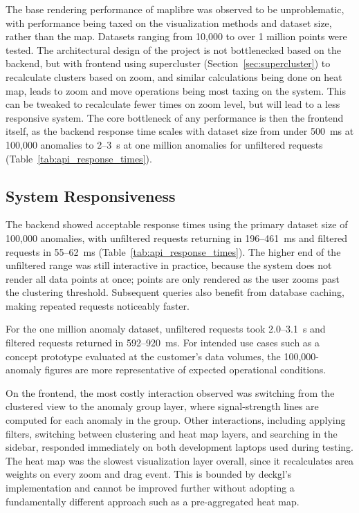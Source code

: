 The base rendering performance of \gls{maplibre} was observed to be unproblematic, with performance being taxed on the visualization methods and dataset size, rather than the map. Datasets ranging from 10,000 to over 1 million points were tested. The architectural design of the project is not bottlenecked based on the backend, but with frontend using supercluster (Section~\ref{sec:supercluster}) to recalculate clusters based on zoom, and similar calculations being done on heat map, leads to zoom and move operations being most taxing on the system. This can be tweaked to recalculate fewer times on zoom level, but will lead to a less responsive system. The core bottleneck of any performance is then the frontend itself, as the backend response time scales with dataset size from under 500~ms at 100,000 anomalies to 2--3~s at one million anomalies for unfiltered requests (Table~\ref{tab:api_response_times}).

\subsection{System Responsiveness}

The backend showed acceptable response times using the primary dataset size of 100,000 anomalies, with unfiltered requests returning in 196--461~ms and filtered requests in 55--62~ms (Table~\ref{tab:api_response_times}). The higher end of the unfiltered range was still interactive in practice, because the system does not render all data points at once; points are only rendered as the user zooms past the clustering threshold. Subsequent queries also benefit from database caching, making repeated requests noticeably faster. 

For the one million anomaly dataset, unfiltered requests took 2.0--3.1~s and filtered requests returned in 592--920~ms. For intended use cases such as a concept prototype evaluated at the customer's data volumes, the 100,000-anomaly figures are more representative of expected operational conditions.

On the frontend, the most costly interaction observed was switching from the clustered view to the anomaly group layer, where signal-strength lines are computed for each anomaly in the group. Other interactions, including applying filters, switching between clustering and heat map layers, and searching in the sidebar, responded immediately on both development laptops used during testing. The heat map was the slowest visualization layer overall, since it recalculates area weights on every zoom and drag event. This is bounded by \gls{deckgl}'s implementation and cannot be improved further without adopting a fundamentally different approach such as a pre-aggregated heat map.

